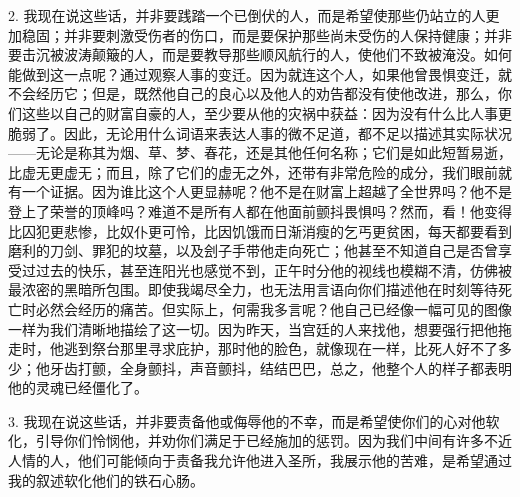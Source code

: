 2. 我现在说这些话，并非要践踏一个已倒伏的人，而是希望使那些仍站立的人更加稳固；并非要刺激受伤者的伤口，而是要保护那些尚未受伤的人保持健康；并非要击沉被波涛颠簸的人，而是要教导那些顺风航行的人，使他们不致被淹没。如何能做到这一点呢？通过观察人事的变迁。因为就连这个人，如果他曾畏惧变迁，就不会经历它；但是，既然他自己的良心以及他人的劝告都没有使他改进，那么，你们这些以自己的财富自豪的人，至少要从他的灾祸中获益：因为没有什么比人事更脆弱了。因此，无论用什么词语来表达人事的微不足道，都不足以描述其实际状况——无论是称其为烟、草、梦、春花，还是其他任何名称；它们是如此短暂易逝，比虚无更虚无；而且，除了它们的虚无之外，还带有非常危险的成分，我们眼前就有一个证据。因为谁比这个人更显赫呢？他不是在财富上超越了全世界吗？他不是登上了荣誉的顶峰吗？难道不是所有人都在他面前颤抖畏惧吗？然而，看！他变得比囚犯更悲惨，比奴仆更可怜，比因饥饿而日渐消瘦的乞丐更贫困，每天都要看到磨利的刀剑、罪犯的坟墓，以及刽子手带他走向死亡；他甚至不知道自己是否曾享受过过去的快乐，甚至连阳光也感觉不到，正午时分他的视线也模糊不清，仿佛被最浓密的黑暗所包围。即使我竭尽全力，也无法用言语向你们描述他在时刻等待死亡时必然会经历的痛苦。但实际上，何需我多言呢？他自己已经像一幅可见的图像一样为我们清晰地描绘了这一切。因为昨天，当宫廷的人来找他，想要强行把他拖走时，他逃到祭台那里寻求庇护，那时他的脸色，就像现在一样，比死人好不了多少；他牙齿打颤，全身颤抖，声音颤抖，结结巴巴，总之，他整个人的样子都表明他的灵魂已经僵化了。\par

3. 我现在说这些话，并非要责备他或侮辱他的不幸，而是希望使你们的心对他软化，引导你们怜悯他，并劝你们满足于已经施加的惩罚。因为我们中间有许多不近人情的人，他们可能倾向于责备我允许他进入圣所，我展示他的苦难，是希望通过我的叙述软化他们的铁石心肠。\par

